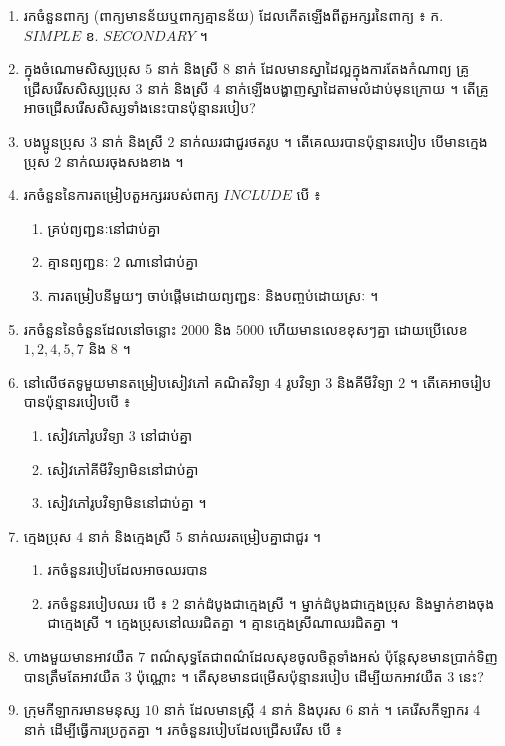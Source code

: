 \begin{enumerate}[1]
  \item រកចំនួនពាក្យ (ពាក្យមានន័យឬពាក្យគ្មានន័យ) ដែលកើតឡើងពីតួអក្សរនៃពាក្យ ៖ \quad ក. $SIMPLE$ \quad ខ. $SECONDARY$ ។
  \item ក្នុងចំណោមសិស្សប្រុស $5$ នាក់ និងស្រី $8$ នាក់ ដែលមានស្នាដៃល្អក្នុងការតែងកំណាព្យ គ្រូជ្រើសរើសសិស្សប្រុស $3$ នាក់ និងស្រី $4$ នាក់ឡើងបង្ហាញស្នាដៃតាមលំដាប់មុនក្រោយ ។ តើគ្រូអាចជ្រើសរើសសិស្សទាំងនេះបានប៉ុន្មានរបៀប?
  \item បងប្អូនប្រុស $3$ នាក់ និងស្រី $2$ នាក់ឈរជាជួរថតរូប ។ តើគេឈរបានប៉ុន្មានរបៀប បើមានក្មេងប្រុស $2$ នាក់ឈរចុងសងខាង ។
  \item រកចំនួននៃការតម្រៀបតួអក្សររបស់ពាក្យ $INCLUDE$ បើ ៖
  \begin{enumerate}[a]
    \item គ្រប់ព្យញ្ជនៈនៅជាប់គ្នា
    \item គ្មានព្យញ្ជនៈ $2$ ណានៅជាប់គ្នា
    \item ការតម្រៀបនីមួយៗ ចាប់ផ្ដើមដោយព្យញ្ជនៈ និងបញ្ចប់ដោយស្រៈ ។
  \end{enumerate}
  \item រកចំនួននៃចំនួនដែលនៅចន្លោះ $2000$ និង $5000$ ហើយមានលេខខុសៗគ្នា ដោយប្រើលេខ $1, 2, 4, 5, 7$ និង $8$ ។
  \item នៅលើថតទូមួយមានតម្រៀបសៀវភៅ គណិតវិទ្យា $4$ រូបវិទ្យា $3$ និងគីមីវិទ្យា $2$ ។ តើគេអាចរៀបបានប៉ុន្មានរបៀបបើ ៖
  \begin{enumerate}[a]
    \item សៀវភៅរូបវិទ្យា $3$ នៅជាប់គ្នា
    \item សៀវភៅគីមីវិទ្យាមិននៅជាប់គ្នា
    \item សៀវភៅរូបវិទ្យាមិននៅជាប់គ្នា ។
  \end{enumerate}
  \item ក្មេងប្រុស $4$ នាក់ និងក្មេងស្រី $5$ នាក់ឈរតម្រៀបគ្នាជាជួរ ។
  \begin{enumerate}[a]
    \item រកចំនួនរបៀបដែលអាចឈរបាន
    \item រកចំនួនរបៀបឈរ បើ ៖ $2$ នាក់ដំបូងជាក្មេងស្រី ។ ម្នាក់ដំបូងជាក្មេងប្រុស និងម្នាក់ខាងចុងជាក្មេងស្រី ។ ក្មេងប្រុសនៅឈរជិតគ្នា ។ គ្មានក្មេងស្រីណាឈរជិតគ្នា ។
  \end{enumerate}
  \item ហាងមួយមានអាវយឺត $7$ ពណ៌សុទ្ធតែជាពណ៌ដែលសុខចូលចិត្តទាំងអស់ ប៉ុន្តែសុខមានប្រាក់ទិញបានត្រឹមតែអាវយឺត $3$ ប៉ុណ្ណោះ ។ តើសុខមានជម្រើសប៉ុន្មានរបៀប ដើម្បីយកអាវយឺត $3$ នេះ?
  \item ក្រុមកីឡាករមានមនុស្ស $10$ នាក់ ដែលមានស្ត្រី $4$ នាក់ និងបុរស $6$ នាក់ ។ គេរើសកីឡាករ $4$ នាក់ ដើម្បីធ្វើការប្រកួតគ្នា ។ រកចំនួនរបៀបដែលជ្រើសរើស បើ ៖

\end{enumerate}
